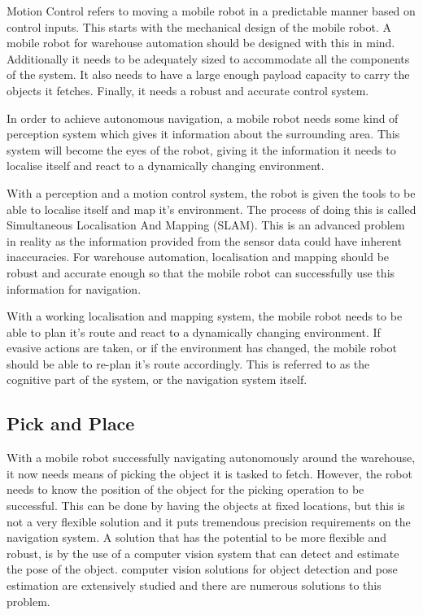 Motion Control refers to moving a mobile robot in a predictable manner based on control inputs. This starts with the mechanical design of the mobile robot. A mobile robot for warehouse automation should be designed with this in mind. Additionally it needs to be adequately sized to accommodate all the components of the system.  It also needs to have a large enough payload capacity to carry the objects it fetches. Finally, it needs a robust and accurate control system.

In order to achieve autonomous navigation, a mobile robot needs some kind of perception system which gives it information about the surrounding area. This system will become the eyes of the robot, giving it the information it needs to localise itself and react to a dynamically changing environment.

With a perception and a motion control system, the robot is given the tools to be able to localise itself and map it's environment. The process of doing this is called Simultaneous Localisation And Mapping (SLAM). This is an advanced problem in reality as the information provided from the sensor data could have inherent inaccuracies.  For warehouse automation, localisation and mapping should be robust and accurate enough so that the mobile robot can successfully use this information for navigation.

With a working localisation and mapping system, the mobile robot needs to be able to plan it's route and react to a dynamically changing environment. If evasive actions are taken, or if the environment has changed, the mobile robot should be able to re-plan it's route accordingly. This is referred to as the cognitive part of the system, or the navigation system itself.

\subsection{Pick and Place} \label{sec:I:PAP}
With a mobile robot successfully navigating autonomously around the warehouse, it now needs means of picking the object it is tasked to fetch. However, the robot needs to know the position of the object for the picking operation to be successful. This can be done by having the objects at fixed locations, but this is not a very flexible solution and it puts tremendous precision requirements on the navigation system. A solution that has the potential to be more flexible and robust, is by the use of a computer vision system that can detect and estimate the pose of the object. computer vision solutions for object detection and pose estimation are extensively studied and there are numerous solutions to this problem.

